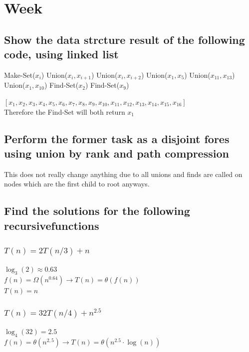 \documentclass[12pt, a4paper]{article}
\begin{document}
	\section{Week}
		\subsection{Show the data strcture result of the following code, using linked list}
			\begin{algorithmic}[1]
					\State Make-Set($x_i$)
				\EndFor
					\State Union($x_i,x_{i+1}$)
				\EndFor
					\State Union($x_i,x_{i+2}$)
				\EndFor
				\State Union($x_1,x_5$)
				\State Union($x_{11},x_{13}$)
				\State Union($x_1,x_{10}$)
				\State Find-Set($x_2$)
				\State Find-Set($x_9$)
			\end{algorithmic}
			$[x_1,x_2,x_3,x_4,x_5,x_6,x_7,x_8,x_9,x_{10},x_{11},x_{12},x_{13},x_{14},x_{15},x_{16}]$\\
			Therefore the Find-Set will both return $x_1$
		\subsection{Perform the former task as a disjoint fores using union by rank and path compression}
			This does not really change anything due to all unions and finds are called on nodes which are the first child to root anyways.
		\subsection{Find the solutions for the following recursivefunctions}
			\subsubsection{$T(n)=2T(n/3)+n$}
				$\log_3(2)\approx 0.63$\\
				$f(n)=\Omega (n^{0.64}) \rightarrow T(n)=\theta (f(n))$\\
				$T(n)=n$
			\subsubsection{$T(n)=32T(n/4)+n^{2.5}$}
				$\log_4(32)=2.5$\\
				$f(n)=\theta(n^{2,5})\rightarrow T(n)=\theta(n^{2.5}\cdot \log(n))$
\end{document}
